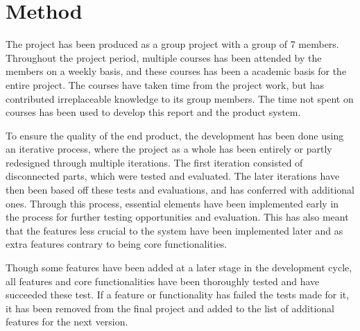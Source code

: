 \section{Method}
The project has been produced as a group project with a group of 7 members. Throughout the project period, multiple courses has been attended by the members on a weekly basis, and these courses has been a academic basis for the entire project. The courses have taken time from the project work, but has contributed irreplaceable knowledge to its group members. The time not spent on courses has been used to develop this report and the product system.
\par
To ensure the quality of the end product, the development has been done using an iterative process, where the project as a whole has been entirely or partly redesigned through multiple iterations. The first iteration consisted of disconnected parts, which were tested and evaluated. The later iterations have then been based off these tests and evaluations, and has conferred with additional ones. Through this process, essential elements have been implemented early in the process for further testing opportunities and evaluation. This has also meant that the features less crucial to the system have been implemented later and as extra features contrary to being core functionalities.
\par
Though some features have been added at a later stage in the development cycle, all features and core functionalities have been thoroughly tested and have succeeded these test. If a feature or functionality has failed the tests made for it, it has been removed from the final project and added to the list of additional features for the next version.